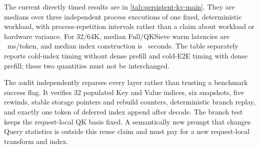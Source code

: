 \begin{table}[h]
\label{tab:persistent-kv-protocol}
\centering
{}
\end{table}

The current directly timed results are in \cref{tab:persistent-kv-main}.
They are medians over three independent process executions of one fixed,
deterministic workload, with process-repetition intervals rather than a claim
about workload or hardware variance.  For 32/64K, median Full/QKSieve warm
latencies are \QKSievePersistentWarmLatencyText\ ms/token, and median index
construction is \QKSievePersistentBuildText\ seconds.  The table separately
reports cold-index timing without dense prefill and cold-E2E timing with dense
prefill; these two quantities must not be interchanged.

The audit independently reparses every layer rather than trusting a benchmark
success flag.  It verifies 32 populated Key and Value indices, six snapshots,
five rewinds, stable storage pointers and rebuild counters, deterministic
branch replay, and exactly one token of deferred index append after decode.
The branch test keeps the request-local QK basis fixed.  A semantically new
prompt that changes Query statistics is outside this reuse claim and must pay
for a new request-local transform and index.

